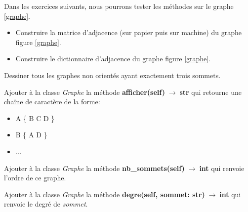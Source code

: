 \documentclass[a4paper,11pt]{article}
\begin{document}
\begin{Form}
Dans les exercices suivants, nous pourrons tester les méthodes sur le graphe \ref{graphe}.
\begin{center}
\label{graphe}
\end{center}
\begin{exo}
\begin{itemize}
\item Construire la matrice d'adjacence (sur papier puis sur machine) du graphe figure \ref{graphe}.
\item Construire le dictionnaire d'adjacence du graphe figure \ref{graphe}.
\end{itemize}
\end{exo}
\begin{exo}
Dessiner tous les graphes non orientés ayant exactement trois sommets.
\end{exo}
\begin{exo}
Ajouter à la classe \emph{Graphe} la méthode \textbf{afficher(self)$\;\rightarrow\;$str} qui retourne une chaîne de caractère de la forme:
\begin{itemize}
\item A \{ B C D \}
\item B \{ A D \}
\item ...
\end{itemize}
\end{exo}
\begin{exo}
Ajouter à la classe \emph{Graphe} la méthode \textbf{nb\_sommets(self)$\;\rightarrow\;$int} qui renvoie l'ordre de ce graphe.
\end{exo}
\begin{exo}
Ajouter à la classe \emph{Graphe} la méthode \textbf{degre(self, sommet: str)$\;\rightarrow\;$int} qui renvoie le degré de \emph{sommet}.
\end{exo}
\begin{exo}
\begin{enumerate}

\end{enumerate}
\end{exo}
\end{Form}
\end{document}
